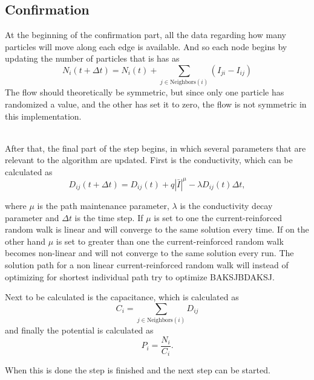 \subsection{Confirmation}
At the beginning of the confirmation part, all the data regarding how many particles will move along each edge is available. And so each node begins by updating the number of particles that is has as
 \begin{equation}
 N_i(t + \Delta t) = N_i(t) + \sum_{j \in \text{Neighbors}(i)} \left( I_{ji} - I_{ij} \right)
 \end{equation}
 The flow should theoretically be symmetric, but since only one particle has randomized a value, and the other has set it to zero, the flow is not symmetric in this implementation.
 
 \ \\
 
\noindent After that, the final part of the step begins, in which several parameters that are relevant to the algorithm are updated. First is the conductivity, which can be calculated as
\begin{equation}
D_{ij}(t + \Delta t) = D_{ij}(t) + q|\bar{I}|^\mu - \lambda D_{ij}(t)\Delta t,
\end{equation}

where $\mu$ is the path maintenance parameter, $\lambda$ is the conductivity decay parameter and $\Delta t$ is the time step. If $\mu$ is set to one the current-reinforced random walk is linear and will converge to the same solution every time. If on the other hand $\mu$ is set to greater than one the current-reinforced random walk becomes non-linear and will not converge to the same solution every run. The solution path for a non linear current-reinforced random walk will instead of optimizing for shortest individual path try to optimize {\color{red} BAKSJBDAKSJ}. 

Next to be calculated is the capacitance, which is calculated as 
 \begin{equation}
 C_i = \sum_{j \in \text{Neighbors}(i)} D_{ij}
 \end{equation}
 and finally the potential is calculated as
 \begin{equation}
 P_i = \frac{N_i}{C_i}.
 \end{equation}
 
 \noindent When this is done the step is finished and the next step can be started.
